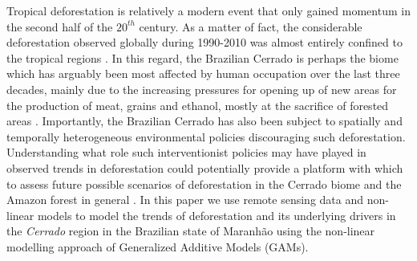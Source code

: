 
Tropical deforestation is relatively a modern event that only gained momentum in the second half of the $20^{th}$ century. As a matter of fact, the considerable deforestation observed globally during 1990-2010 was almost entirely confined to the tropical regions \citep{CULAS12}.  In this regard, the Brazilian Cerrado is perhaps the biome which has arguably been most affected by human occupation over the last three decades, mainly due to the increasing pressures for opening up of new areas for the production of meat, grains and ethanol, mostly at the sacrifice of forested areas \citep{mma_2018, bayma_sano_2015}. Importantly, the Brazilian Cerrado has also been subject to spatially and temporally heterogeneous environmental policies discouraging such deforestation.  Understanding what role such interventionist policies may have played in observed trends in deforestation could potentially provide a platform with which to assess future possible scenarios of deforestation in the Cerrado biome and the Amazon forest in general \citep{boyd_2013}. In this paper we use remote sensing data and non-linear models to model the trends of deforestation and its underlying drivers in the \textit{Cerrado} region in the Brazilian state of Maranhão using the non-linear modelling approach of Generalized Additive Models (GAMs). 

